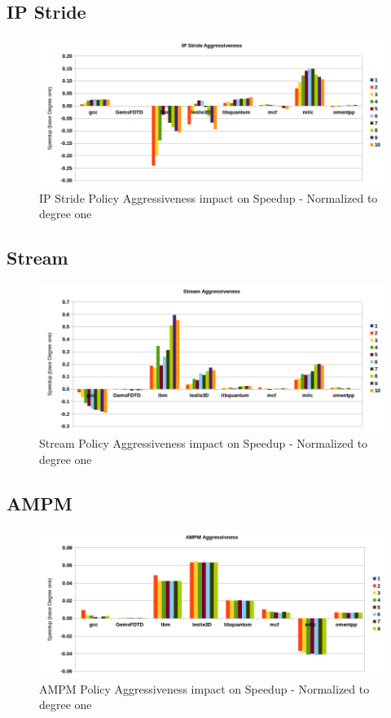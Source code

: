 \documentclass{article}
\begin{document}
\subsection{IP Stride}


\begin{figure}[!h]
  \label{pic:ip-agg}
  \centering
    \includegraphics[width=1\textwidth]{ip_agg.png}
    \caption{IP Stride Policy Aggressiveness impact on Speedup - Normalized to degree one}
\end{figure}

\subsection{Stream}


\begin{figure}[!h]
  \label{pic:stream-agg}
  \centering
    \includegraphics[width=1\textwidth]{stream_agg.png}
    \caption{Stream Policy Aggressiveness impact on Speedup - Normalized to degree one}
\end{figure}

\subsection{AMPM}

\begin{figure}[!h]
  \label{pic:ampm-agg}
  \centering
    \includegraphics[width=1\textwidth]{ampm_agg.png}
    \caption{AMPM Policy Aggressiveness impact on Speedup - Normalized to degree one}
\end{figure}
\end{document}
